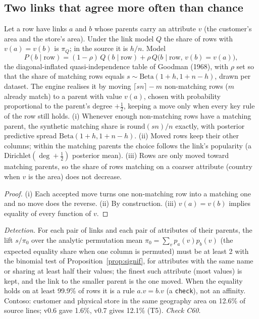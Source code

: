 \subsection{Two links that agree more often than chance}
\begin{proposition}\label{prop:affinity}
Let a row have links $a$ and $b$ whose parents carry an attribute $v$ (the customer's area and the store's area). Under the link model $Q$ the share of rows with $v(a)=v(b)$ is $\pi_Q$; in the source it is $h/n$. Model
\[P(b\mid\text{row})=(1-\rho)\,Q(b\mid\text{row})+\rho\,Q\bigl(b\mid\text{row},\,v(b)=v(a)\bigr),\]
the diagonal-inflated quasi-independence table of Goodman (1968), with $\rho$ set so that the share of matching rows equals $s\sim\mathrm{Beta}(1+h,1+n-h)$, drawn per dataset. The engine realises it by moving $\lceil sn\rceil-m$ non-matching rows ($m$ already match) to a parent with value $v(a)$, chosen with probability proportional to the parent's degree $+\frac12$, keeping a move only when every key rule of the row still holds. (i) Whenever enough non-matching rows have a matching parent, the synthetic matching share is $\mathrm{round}(sn)/n$ exactly, with posterior predictive spread $\mathrm{Beta}(1+h,1+n-h)$. (ii) Moved rows keep their other columns; within the matching parents the choice follows the link's popularity (a Dirichlet$(\deg+\frac12)$ posterior mean). (iii) Rows are only moved toward matching parents, so the share of rows matching on a coarser attribute (country when $v$ is the area) does not decrease.
\end{proposition}
\begin{proof}
(i) Each accepted move turns one non-matching row into a matching one and no move does the reverse. (ii) By construction. (iii) $v(a)=v(b)$ implies equality of every function of $v$.
\end{proof}
\noindent \emph{Detection.} For each pair of links and each pair of attributes of their parents, the lift $s/\pi_0$ over the analytic permutation mean $\pi_0=\sum_v p_a(v)p_b(v)$ (the expected equality share when one column is permuted) must be at least 2 with the binomial test of Proposition~\ref{prop:signif}, for attributes with the same name or sharing at least half their values; the finest such attribute (most values) is kept, and the link to the smaller parent is the one moved. When the equality holds on at least 99.9\% of rows it is a rule $a.v=b.v$ (a \texttt{check}), not an affinity. Contoso: customer and physical store in the same geography area on 12.6\% of source lines; v0.6 gave 1.6\%, v0.7 gives 12.1\% (T5). \emph{Check C60}.

